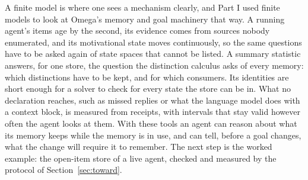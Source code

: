 \documentclass[11pt]{article}
\theoremstyle{definition}
\theoremstyle{plain}
\begin{document}
A finite model is where one sees a mechanism clearly, and Part I used finite models to look at
Omega's memory and goal machinery that way. A running agent's items age by the second, its evidence
comes from sources nobody enumerated, and its motivational state moves continuously, so the same
questions have to be asked again of state spaces that cannot be listed. A summary statistic answers,
for one store, the question the distinction calculus asks of every memory: which distinctions have
to be kept, and for which consumers. Its identities are short enough for a solver to check for every
state the store can be in. What no declaration reaches, such as missed replies or what the language
model does with a context block, is measured from receipts, with intervals that stay valid however
often the agent looks at them. With these tools an agent can reason about what its memory keeps
while the memory is in use, and can tell, before a goal changes, what the change will require it to
remember. The next step is the worked example: the open-item store of a live agent, checked and
measured by the protocol of Section~\ref{sec:toward}.
\end{document}
